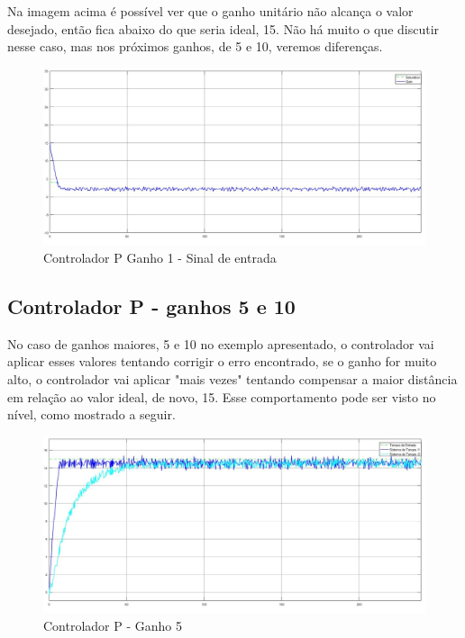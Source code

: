 \documentclass[
	12pt,				%
	openany,			%
	oneside,			%
	a4paper,			%
	english,			%
	french,				%
	spanish,			%
	brazil,				%
	]{abntex2}
\begin{document}
{Na imagem acima é possível ver que o ganho unitário não alcança o valor desejado, então fica abaixo do que seria ideal, 15. Não há muito o que discutir nesse caso, mas nos próximos ganhos, de 5 e 10, veremos diferenças.

\begin{figure}[h]
	\centering
	\includegraphics[scale=0.30]{osciloscopio_ganho_1.jpg}
	\caption{Controlador P Ganho 1 - Sinal de entrada}
\end{figure}

\subsection{Controlador P - ganhos 5 e 10}

No caso de ganhos maiores, 5 e 10 no exemplo apresentado, o controlador vai aplicar esses valores tentando corrigir o erro encontrado, se o ganho for muito alto, o controlador vai aplicar "mais vezes" tentando compensar a maior distância em relação ao valor ideal, de novo, 15. Esse comportamento pode ser visto no nível, como mostrado a seguir.

\begin{figure}[h]
	\centering
	\includegraphics[scale=0.30]{controlador_p_ganho_5.jpg}
	\caption{Controlador P - Ganho 5}
\end{figure}

}
\end{document}
